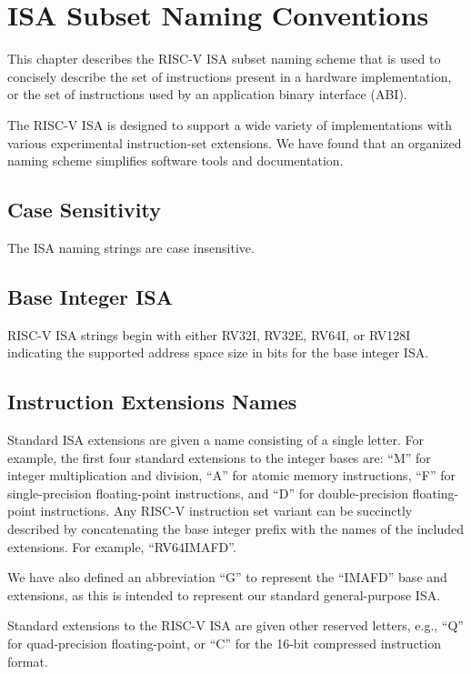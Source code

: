 \chapter{ISA Subset Naming Conventions}
\label{naming}

This chapter describes the RISC-V ISA subset naming scheme that is
used to concisely describe the set of instructions present in a
hardware implementation, or the set of instructions used by an
application binary interface (ABI).

\begin{commentary}
The RISC-V ISA is designed to support a wide variety of
implementations with various experimental instruction-set extensions.
We have found that an organized naming scheme simplifies software
tools and documentation.
\end{commentary}

\section{Case Sensitivity}

The ISA naming strings are case insensitive.

\section{Base Integer ISA}
RISC-V ISA strings begin with either RV32I, RV32E, RV64I, or RV128I
indicating the supported address space size in bits for the base
integer ISA.

\section{Instruction Extensions Names}

Standard ISA extensions are given a name consisting of a single
letter.  For example, the first four standard
extensions to the integer bases are:
``M'' for integer multiplication and division,
``A'' for atomic memory instructions,
``F'' for single-precision floating-point instructions, and
``D'' for double-precision floating-point instructions.
Any RISC-V instruction set variant can be succinctly described by
concatenating the base integer prefix with the names of the included
extensions.  For example, ``RV64IMAFD''.

We have also defined an abbreviation ``G'' to represent the ``IMAFD''
base and extensions, as this is intended to represent our standard
general-purpose ISA.

Standard extensions to the RISC-V ISA are given other reserved
letters, e.g., ``Q'' for quad-precision floating-point, or
``C'' for the 16-bit compressed instruction format.

